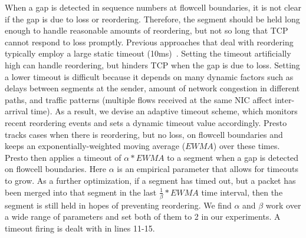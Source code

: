 When a gap is detected in sequence numbers at flowcell boundaries, it is not clear if the gap is due
to loss or reordering. Therefore, the segment should be held long enough to
handle reasonable amounts of reordering, but not so long that TCP cannot respond
to loss promptly. Previous approaches that deal with reordering typically employ a large static
timeout (10ms)~\cite{drb}. 
Setting the timeout artificially high can handle reordering, but hinders TCP when the gap is
due to loss. 
Setting a lower timeout is difficult because it depends on many dynamic factors such as delays between
segments at the sender, amount of network congestion in different paths, and traffic patterns (multiple flows 
received at the same NIC affect inter-arrival time). 
As a result, we devise an adaptive timeout scheme, which monitors recent reordering events and sets a dynamic timeout value accordingly.
Presto tracks cases when there is reordering, but no loss, on flowcell boundaries and keeps an exponentially-weighted
moving average ($EWMA$) over these times. Presto then applies a timeout of $\alpha * EWMA$ to a segment when a gap is 
detected on flowcell boundaries. 
Here $\alpha$ is an empirical parameter that allows for timeouts to grow. As a further optimization, if a segment
has timed out, but a packet has been merged into that segment in the last $\frac{1}{\beta} * EWMA$ time interval, then 
the segment is still held in hopes of preventing reordering. We find $\alpha$ and $\beta$
work over a wide range of parameters and set both of them to 2 in our experiments. A timeout firing is dealt with in lines 11-15.


